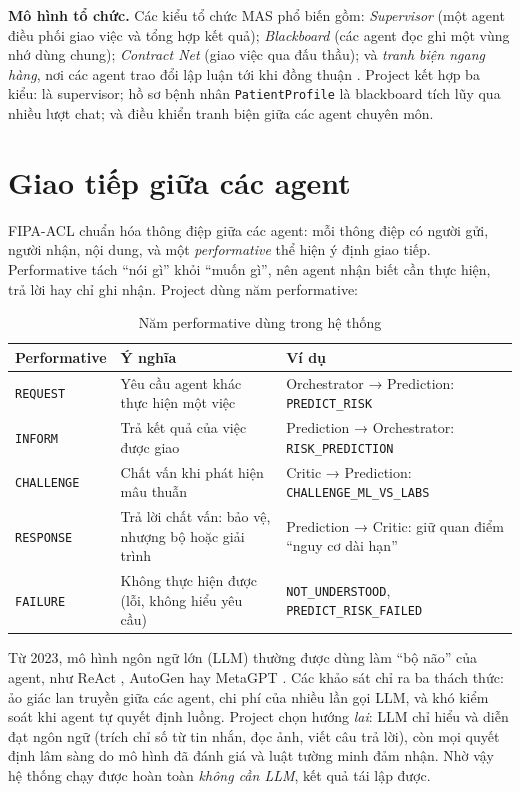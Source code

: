 \textbf{Mô hình tổ chức.} Các kiểu tổ chức MAS phổ biến gồm: \emph{Supervisor} (một agent điều phối giao việc và tổng hợp kết quả); \emph{Blackboard} \cite{hayesroth1985} (các agent đọc ghi một vùng nhớ dùng chung); \emph{Contract Net} \cite{smith1980} (giao việc qua đấu thầu); và \emph{tranh biện ngang hàng}, nơi các agent trao đổi lập luận tới khi đồng thuận \cite{du2024debate}. Project kết hợp ba kiểu:  là supervisor; hồ sơ bệnh nhân \texttt{PatientProfile} là blackboard tích lũy qua nhiều lượt chat; và  điều khiển tranh biện giữa các agent chuyên môn.

\section{Giao tiếp giữa các agent}

FIPA-ACL \cite{fipa2002} chuẩn hóa thông điệp giữa các agent: mỗi thông điệp có người gửi, người nhận, nội dung, và một \emph{performative} thể hiện ý định giao tiếp. Performative tách ``nói gì'' khỏi ``muốn gì'', nên agent nhận biết cần thực hiện, trả lời hay chỉ ghi nhận. Project dùng năm performative:

\begin{table}[H]
\centering
\caption{Năm performative dùng trong hệ thống}
\label{tab:perf}
\small
\begin{tabularx}{\linewidth}{@{}L{2.6cm}Y L{4.6cm}@{}}
\toprule
\textbf{Performative} & \textbf{Ý nghĩa} & \textbf{Ví dụ} \\
\midrule
\texttt{REQUEST} & Yêu cầu agent khác thực hiện một việc & Orchestrator → Prediction: \texttt{PREDICT\_RISK} \\
\texttt{INFORM} & Trả kết quả của việc được giao & Prediction → Orchestrator: \texttt{RISK\_PREDICTION} \\
\texttt{CHALLENGE} & Chất vấn khi phát hiện mâu thuẫn & Critic → Prediction: \texttt{CHALLENGE\_ML\_VS\_LABS} \\
\texttt{RESPONSE} & Trả lời chất vấn: bảo vệ, nhượng bộ hoặc giải trình & Prediction → Critic: giữ quan điểm ``nguy cơ dài hạn'' \\
\texttt{FAILURE} & Không thực hiện được (lỗi, không hiểu yêu cầu) & \texttt{NOT\_UNDERSTOOD}, \texttt{PREDICT\_RISK\_FAILED} \\
\bottomrule
\end{tabularx}
\end{table}

Từ 2023, mô hình ngôn ngữ lớn (LLM) thường được dùng làm ``bộ não'' của agent, như ReAct \cite{yao2023react}, AutoGen \cite{wu2023autogen} hay MetaGPT \cite{hong2024metagpt}. Các khảo sát \cite{wang2024agents,guo2024mas} chỉ ra ba thách thức: ảo giác lan truyền giữa các agent, chi phí của nhiều lần gọi LLM, và khó kiểm soát khi agent tự quyết định luồng. Project chọn hướng \emph{lai}: LLM chỉ hiểu và diễn đạt ngôn ngữ (trích chỉ số từ tin nhắn, đọc ảnh, viết câu trả lời), còn mọi quyết định lâm sàng do mô hình đã đánh giá và luật tường minh đảm nhận. Nhờ vậy hệ thống chạy được hoàn toàn \emph{không cần LLM}, kết quả tái lập được.
